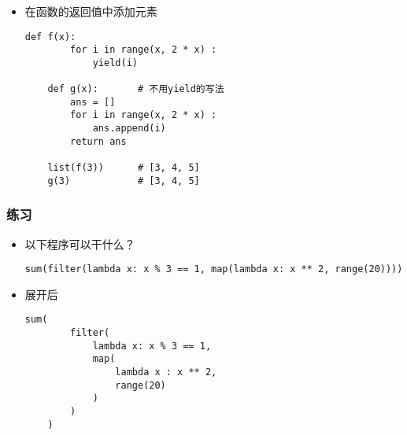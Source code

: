 \begin{frame} [fragile]
	\frametitle{}
	\begin{itemize}
	\item {}在函数的返回值中添加元素
	\begin{lstlisting}[style=pythonstyle, gobble=4, texcl]
	def f(x):
		for i in range(x, 2 * x) :
			yield(i)

	def g(x):		# 不用yield的写法
		ans = []
		for i in range(x, 2 * x) :
			ans.append(i)
		return ans

	list(f(3))		# [3, 4, 5]
	g(3)			# [3, 4, 5]
	\end{lstlisting}
	\end{itemize}
\end{frame}

\begin{frame} [fragile]
	\frametitle{练习}
	\begin{itemize}
	\item 以下程序可以干什么？
	\begin{lstlisting}[style=pythonstyle, gobble=4, texcl]
	sum(filter(lambda x: x % 3 == 1, map(lambda x: x ** 2, range(20))))
	\end{lstlisting}
	\item 展开后
	\begin{lstlisting}[style=pythonstyle, gobble=4, texcl]
	sum(
		filter(
			lambda x: x % 3 == 1,
			map(
				lambda x : x ** 2,
				range(20)
			)
		)
	)
	\end{lstlisting}
	\end{itemize}
\end{frame}

